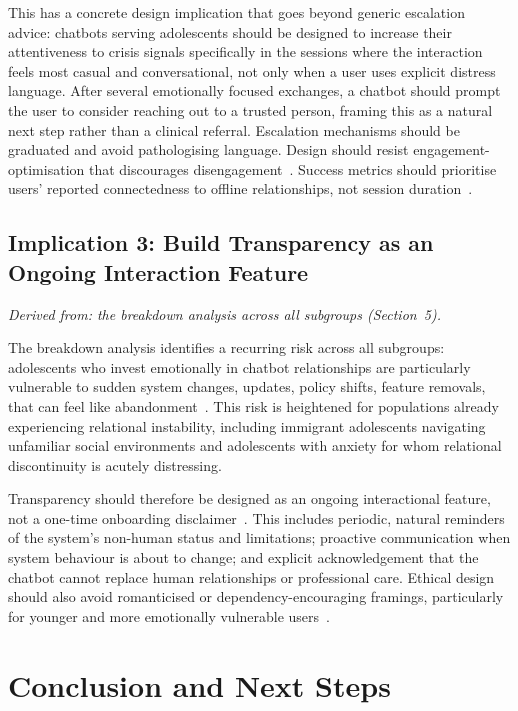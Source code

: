 \documentclass[manuscript]{acmart}
\begin{document}
This has a concrete design implication that goes beyond generic escalation advice: chatbots
serving adolescents should be designed to increase their attentiveness to crisis
signals specifically in the sessions where the interaction feels most casual and
conversational, not only when a user uses explicit distress language. After several
emotionally focused exchanges, a chatbot should prompt the user to consider reaching out to a
trusted person, framing this as a natural next step rather than a clinical referral.
Escalation mechanisms should be graduated and avoid pathologising language. Design should
resist engagement-optimisation that discourages disengagement~\cite{de2025emotional,moore2025expressing}.
Success metrics should prioritise users' reported connectedness to offline relationships, not
session duration~\cite{herbener2025lonely}.

\subsection{Implication 3: Build Transparency as an Ongoing Interaction Feature}

\textit{Derived from: the breakdown analysis across all subgroups (Section~5).} 

The breakdown analysis identifies a recurring risk across all subgroups: adolescents who
invest emotionally in chatbot relationships are particularly vulnerable to sudden system
changes, updates, policy shifts, feature removals, that can feel like
abandonment~\cite{yu2025youth}. This risk is heightened for populations already experiencing
relational instability, including immigrant adolescents navigating unfamiliar social
environments and adolescents with anxiety for whom relational discontinuity is acutely
distressing. 

Transparency should therefore be designed as an ongoing interactional feature, not a
one-time onboarding disclaimer~\cite{Alershi2019}. This includes periodic, natural
reminders of the system's non-human status and limitations; proactive communication when
system behaviour is about to change; and explicit acknowledgement that the chatbot cannot
replace human relationships or professional care. Ethical design should also avoid
romanticised or dependency-encouraging framings, particularly for younger and more
emotionally vulnerable users~\cite{Hawke2025}.


\section{Conclusion and Next Steps}
\end{document}
